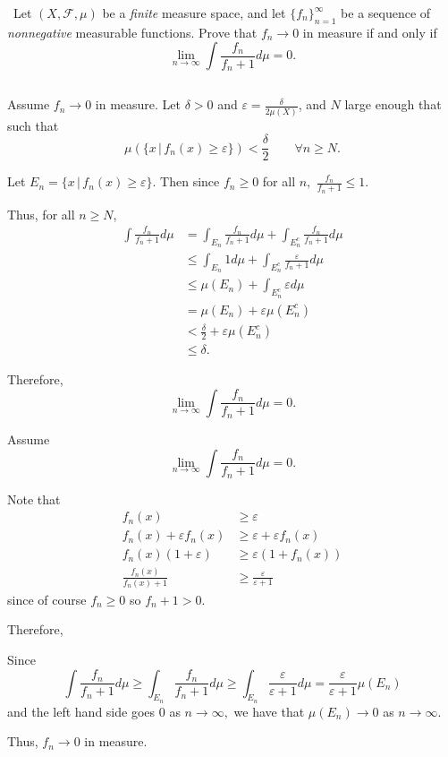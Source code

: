 \documentclass[12pt]{Qual}
\begin{document}
\begin{problem} $\,$
Let $(X,\mathscr{F},\mu)$ be a \textit{finite} measure space, and let $\{f_n\}_{n=1}^\infty$ be a sequence of \textit{nonnegative} measurable functions. Prove that $f_n\to0$ in measure if and only if $$\lim_{n\to\infty}\int\frac{f_n}{f_n+1}d\mu=0.$$
\end{problem}


\begin{solution}$\,$

\boxed{\implies} Assume $f_n\to0$ in measure. Let $\delta>0$ and $\varepsilon=\frac{\delta}{2\mu(X)}$, and $N$ large enough that such that $$\mu(\{x\,|\,f_n(x)\ge\varepsilon\})<\frac{\delta}{2}\qquad \forall n\ge N.$$


Let $E_n=\{x\,|\,f_n(x)\ge\varepsilon\}$. Then since $f_n\ge0$ for all $n,$ $\frac{f_n}{f_n+1}\le1$.

Thus, for all $n\ge N$, \begin{align*}
    \int\frac{f_n}{f_n+1}d\mu&=\int_{E_n}\frac{f_n}{f_n+1}d\mu+\int_{E_n^c}\frac{f_n}{f_n+1}d\mu\\
    &\le\int_{E_n}1d\mu+\int_{E_n^c}\frac{\varepsilon}{f_n+1}d\mu\\
    &\le\mu(E_n)+\int_{E_n^c}\varepsilon d\mu\\
     &=\mu(E_n)+\varepsilon\mu(E_n^c)\\
     &<\frac{\delta}{2}+\varepsilon\mu(E_n^c)\\
     &\le\delta.
\end{align*}

Therefore, $$\lim_{n\to\infty}\int\frac{f_n}{f_n+1}d\mu=0.$$

\boxed{\impliedby} Assume $$\lim_{n\to\infty}\int\frac{f_n}{f_n+1}d\mu=0.$$

Note that \begin{align*}
    f_n(x)&\ge\varepsilon\\
    f_n(x)+\varepsilon f_n(x)&\ge\varepsilon+\varepsilon f_n(x)\\
    f_n(x)(1+\varepsilon)&\ge\varepsilon(1+f_n(x))\\
    \frac{f_n(x)}{f_n(x)+1}&\ge \frac{\varepsilon}{\varepsilon+1}
\end{align*} since of course $f_n\ge0$ so $f_n+1>0.$

Therefore,

Since $$\int\frac{f_n}{f_n+1}d\mu\ge\int_{E_n}\frac{f_n}{f_n+1}d\mu\ge\int_{E_n}\frac{\varepsilon}{\varepsilon+1}d\mu=\frac{\varepsilon}{\varepsilon+1}\mu(E_n)$$ and the left hand side goes $0$ as $n\to\infty,$ we have that $\mu(E_n)\to0$ as $n\to\infty.$

Thus, $f_n\to0$ in measure.
\end{solution}
\newpage
\end{document}
